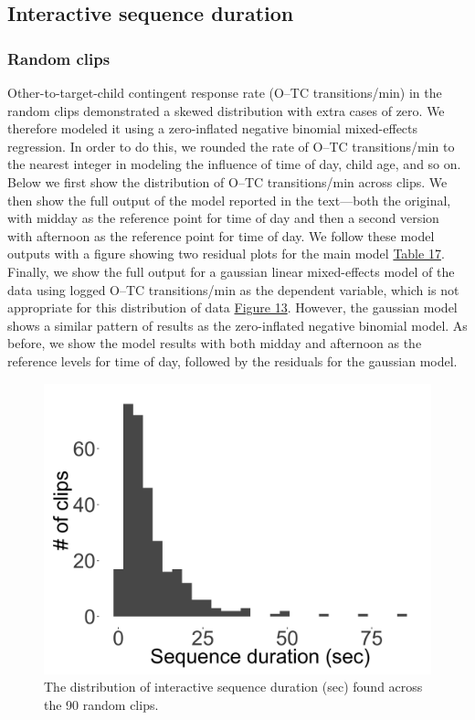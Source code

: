 \documentclass[floatsintext,man]{apa6}
\theoremstyle{definition}
\theoremstyle{definition}
\theoremstyle{definition}
\theoremstyle{remark}
\begin{document}
\newpage

\subsection{Interactive sequence duration}\label{models-seqdur}

\subsubsection{Random clips}\label{models-seqdur-random}

Other-to-target-child contingent response rate (O--TC transitions/min)
in the random clips demonstrated a skewed distribution with extra cases
of zero. We therefore modeled it using a zero-inflated negative binomial
mixed-effects regression. In order to do this, we rounded the rate of
O--TC transitions/min to the nearest integer in modeling the influence
of time of day, child age, and so on. Below we first show the
distribution of O--TC transitions/min across clips. We then show the
full output of the model reported in the text---both the original, with
midday as the reference point for time of day and then a second version
with afternoon as the reference point for time of day. We follow these
model outputs with a figure showing two residual plots for the main
model \protect\hyperlink{tab17}{Table 17}. Finally, we show the full
output for a gaussian linear mixed-effects model of the data using
logged O--TC transitions/min as the dependent variable, which is not
appropriate for this distribution of data
\protect\hyperlink{fig13}{Figure 13}. However, the gaussian model shows
a similar pattern of results as the zero-inflated negative binomial
model. As before, we show the model results with both midday and
afternoon as the reference levels for time of day, followed by the
residuals for the gaussian model.

\begin{figure}

{\centering \includegraphics[width=0.4\linewidth]{www/seqdur_random_distribution} 

}

\caption{The distribution of interactive sequence duration (sec) found across the 90 random clips.}\label{fig:fig25}
\end{figure}
\end{document}
